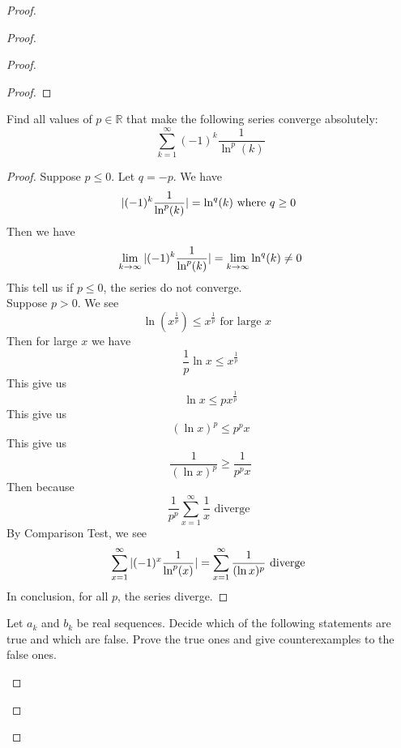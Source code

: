 \documentclass{report}
\begin{document}
\begin{proof}
\begin{proof}
\begin{proof}
\begin{proof}
\end{proof}

\begin{question}{}{}
Find all values of \( p \in \mathbb{R} \) that make the following series converge absolutely:
\[
\sum_{k=1}^{\infty} (-1)^k \frac{1}{\ln^p (k)}
\]
\end{question}
\begin{proof}
Suppose $p\leq 0$. Let $q=-p$. We have
 \begin{equation*}
|(-1)^k \frac{1}{\ln^p(k)}|=\ln^q (k)\text{ where $q\geq 0$ }
\end{equation*}
Then we have
\begin{equation*}
\lim_{k\to\infty} |(-1)^k \frac{1}{\ln^p (k)}|= \lim_{k\to\infty}\ln^q (k)\neq 0
\end{equation*}
This tell us if $p\leq 0$, the series do not converge.\\

Suppose $p>0$. We see 
 \begin{equation*}
\ln(x^{\frac{1}{p}})\leq  x^{\frac{1}{p}}\text{ for large $x$ }
\end{equation*}
Then for large $x$ we have
 \begin{equation*}
\frac{1}{p}\ln x\leq x^{\frac{1}{p}}
\end{equation*}
This give us
\begin{equation*}
\ln x\leq  px^{\frac{1}{p}}
\end{equation*}
This give us
\begin{equation*}
  (\ln x)^p\leq p^p x
\end{equation*}
This give us 
\begin{equation*}
\frac{1}{ (\ln x)^p}\geq \frac{1}{p^px}
\end{equation*}
Then because 
\begin{equation*}
\frac{1}{p^p}\sum_{x=1}^\infty \frac{1}{x}\text{ diverge }
\end{equation*}
By Comparison Test, we see 
\begin{equation*}
\sum_{x=1}^\infty |(-1)^x \frac{1}{\ln^p (x)}|=\sum_{x=1}^\infty \frac{1}{(\ln x)^p}\text{ diverge }
\end{equation*}
In conclusion, for all $p$, the series diverge.
\end{proof}

\begin{question}{}{}
Let \( a_k \) and \( b_k \) be real sequences. Decide which of the following statements are true and which are false. Prove the true ones and give counterexamples to the false ones.


\end{question}
\end{proof}
\end{proof}
\end{proof}
\end{document}

